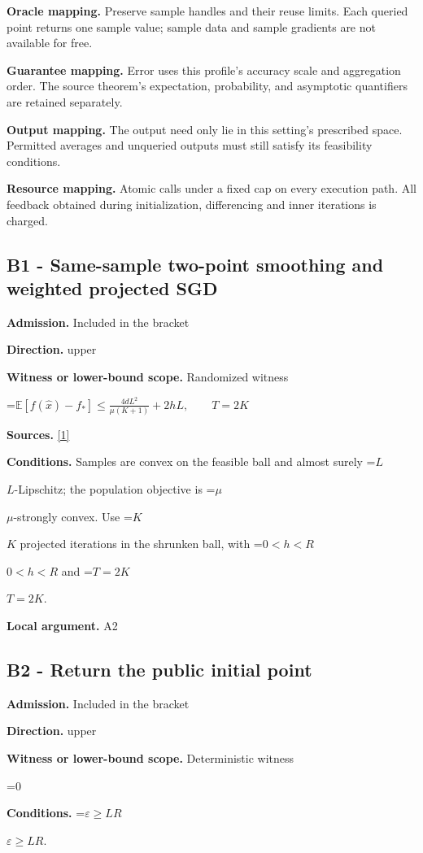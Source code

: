 \documentclass[10pt,a4paper]{article}
\newcommand{\AtlasMath}[1]{\par\begingroup\centering\setbox0=\hbox{$\displaystyle #1$}\ifdim\wd0>1.4\linewidth\typeout{ATLAS WIDE FORMULA: \the\wd0}\fi\ifdim\wd0>\linewidth\resizebox{\linewidth}{!}{\box0}\else\box0\fi\par\endgroup}
\newcommand{\AtlasInlineMath}[1]{\begingroup\setbox0=\hbox{$#1$}\ifdim\wd0>.4\linewidth\endgroup\AtlasMath{#1}\else\endgroup$#1$\fi}
\begin{document}
\textbf{Oracle mapping.} Preserve sample handles and their reuse limits. Each queried point returns one sample value; sample data and sample gradients are not available for free.

\textbf{Guarantee mapping.} Error uses this profile's accuracy scale and aggregation order. The source theorem's expectation, probability, and asymptotic quantifiers are retained separately.

\textbf{Output mapping.} The output need only lie in this setting's prescribed space. Permitted averages and unqueried outputs must still satisfy its feasibility conditions.

\textbf{Resource mapping.} Atomic calls under a fixed cap on every execution path. All feedback obtained during initialization, differencing and inner iterations is charged.

\subsection{B1 - Same-sample two-point smoothing and weighted projected SGD}
\textbf{Admission.} Included in the bracket

\textbf{Direction.} upper

\textbf{Witness or lower-bound scope.} Randomized witness

\AtlasMath{\mathbb{E}[f(\widehat{x})-f_*]\le\frac{4dL^2}{\mu(K+1)}+2hL,\qquad T=2K}
\textbf{Sources.} \href{https://jmlr.org/papers/volume18/16-632/16-632.pdf}{[1]}

\textbf{Conditions.} Samples are convex on the feasible ball and almost surely \AtlasInlineMath{L}-Lipschitz; the population objective is \AtlasInlineMath{\mu}-strongly convex. Use \AtlasInlineMath{K} projected iterations in the shrunken ball, with \AtlasInlineMath{0<h<R} and \AtlasInlineMath{T=2K}.

\textbf{Local argument.} A2

\subsection{B2 - Return the public initial point}
\textbf{Admission.} Included in the bracket

\textbf{Direction.} upper

\textbf{Witness or lower-bound scope.} Deterministic witness

\AtlasMath{0}
\textbf{Conditions.} \AtlasInlineMath{\varepsilon\ge LR}.
\end{document}
